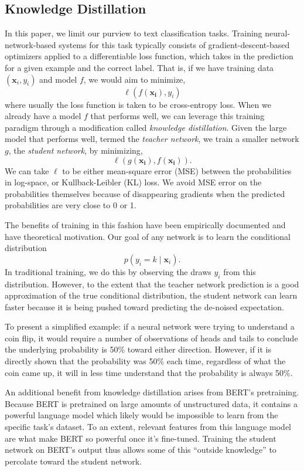 \documentclass[10pt]{article}
\begin{document}
\subsection{Knowledge Distillation}
\label{subsec:kd}

In this paper, we limit our purview to text classification tasks. Training
neural-network-based systems for this task typically consists of
gradient-descent-based optimizers applied to a differentiable loss
function, which takes in the prediction for a given example and the correct label. That is, if we have
training data $(\bm{x}_i, y_i)$ and model $f$, we would aim to minimize,
\[ \ell(f(\bm{x_i}), y_i)\]
where usually the loss function is taken to be cross-entropy loss. When we
already have a model $f$ that performs well, we can leverage this training
paradigm through a modification called \emph{knowledge distillation}. Given
the large model that performs well, termed the \emph{teacher network}, we
train a smaller network $g$, the \emph{student network}, by minimizing,
\[ \ell(g(\bm{x_i}), f(\bm{x_i})).\]
We can take
$\ell$ to be either mean-square error (MSE) between the probabilities in
log-space, or Kullback-Leibler (KL) loss. We avoid MSE error on the
probabilities themselves because of disappearing gradients when the predicted
probabilities are very close to 0 or 1.

The benefits of training in this fashion have been empirically documented
\citep{hinton2015distilling} and have theoretical motivation. Our goal of any
network is to learn the conditional distribution 
\[ p(y_i = k \mid \bm{x}_i).\]
In traditional training, we do this by observing the draws $y_i$ from this
distribution. However, to the extent that the teacher network prediction is a
good approximation of the true conditional distribution, the student network
can learn faster because it is being pushed toward predicting the de-noised
expectation.

To present a simplified example: if a neural network were trying to understand
a coin flip, it would require a number of observations of heads and tails to
conclude the underlying probability is 50\% toward either direction. However,
if it is directly shown that the probability was 50\% each time, regardless of
what the coin came up, it will in less time understand that the probability is
always 50\%.

An additional benefit from knowledge distillation arises from BERT's
pretraining. Because BERT is pretrained on large amounts of unstructured
data, it contains a powerful language model which likely would be impossible
to learn from the specific task's dataset. To an extent, relevant features
from this language model are what make BERT so powerful once it's fine-tuned.
Training the student network on BERT's output thus allows some of this
``outside knowledge'' to percolate toward the student network.
\end{document}
